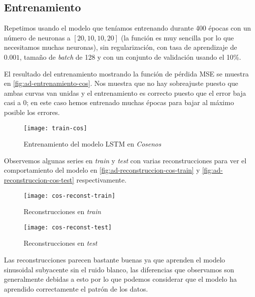 \subsection{Entrenamiento}

Repetimos usando el modelo que teníamos entrenando durante 400 épocas con un número de neuronas a $[20, 10, 10, 20]$ (la función es muy sencilla por lo que necesitamos muchas neuronas), sin regularización, con tasa de aprendizaje de $0.001$, tamaño de \emph{batch} de 128 y con un conjunto de validación usando el 10\%.

El resultado del entrenamiento mostrando la función de pérdida MSE se muestra en \autoref{fig:ad-entrenamiento-cos}. Nos muestra que no hay sobreajuste puesto que ambas curvas van unidas y el entrenamiento es correcto puesto que el error baja casi a 0; en este caso hemos entrenado muchas épocas para bajar al máximo posible los errores.

\begin{figure}[htpb]
  \centering
  \texttt{[image: train-cos]}
  \caption{Entrenamiento del modelo LSTM en \emph{Cosenos}}
  \label{fig:ad-entrenamiento-cos}
\end{figure}

Observemos algunas series en \emph{train} y \emph{test} con varias reconstrucciones para ver el comportamiento del modelo en \autoref{fig:ad-reconstruccion-cos-train} y \autoref{fig:ad-reconstruccion-cos-test} respectivamente.

\begin{figure}[htpb]
  \centering
  \texttt{[image: cos-reconst-train]}
  \caption{Reconstrucciones en \emph{train}}
  \label{fig:ad-reconstruccion-cos-train}
\end{figure}

\begin{figure}[htpb]
  \centering
  \texttt{[image: cos-reconst-test]}
  \caption{Reconstrucciones en \emph{test}}
  \label{fig:ad-reconstruccion-cos-test}
\end{figure}

Las reconstrucciones parecen bastante buenas ya que aprenden el modelo sinusoidal subyacente sin el ruido blanco, las diferencias que observamos son generalmente debidas a esto por lo que podemos considerar que el modelo ha aprendido correctamente el patrón de los datos.

